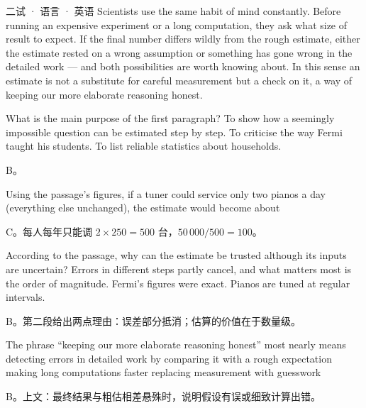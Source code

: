 \documentclass[cjk=noto, seal=first]{mojing-exam}
\begin{document}
\begin{paper}[time={建议 2 小时（训练设置）}, full=100]{二试 · 语言 · 英语}
Scientists use the same habit of mind constantly. Before running an expensive experiment or a long computation, they ask what size of
result to expect. If the final number differs wildly from the rough estimate, either the estimate rested on a wrong assumption or
something has gone wrong in the detailed work --- and both possibilities are worth knowing about. In this sense an estimate is not a
substitute for careful measurement but a check on it, a way of keeping our more elaborate reasoning honest.

\begin{questions}
\question[4] What is the main purpose of the first paragraph? \paren[B]
        {To show how a seemingly impossible question can be estimated step by step.}
        {To criticise the way Fermi taught his students.}
        {To list reliable statistics about households.}
\begin{solution}
B。
\end{solution}

\question[4] Using the passage's figures, if a tuner could service only two pianos a day (everything else unchanged), the estimate would
become about \paren[C]
\begin{solution}
C。每人每年只能调 $2\times250=500$ 台，$50\,000/500=100$。
\end{solution}

\question[4] According to the passage, why can the estimate be trusted although its inputs are uncertain? \paren[B]
        {Errors in different steps partly cancel, and what matters most is the order of magnitude.}
        {Fermi's figures were exact.}
        {Pianos are tuned at regular intervals.}
\begin{solution}
B。第二段给出两点理由：误差部分抵消；估算的价值在于数量级。
\end{solution}

\question[4] The phrase ``keeping our more elaborate reasoning honest'' most nearly means \paren[B]
        {detecting errors in detailed work by comparing it with a rough expectation}
        {making long computations faster}
        {replacing measurement with guesswork}
\begin{solution}
B。上文：最终结果与粗估相差悬殊时，说明假设有误或细致计算出错。
\end{solution}


\end{questions}
\end{paper}
\end{document}
